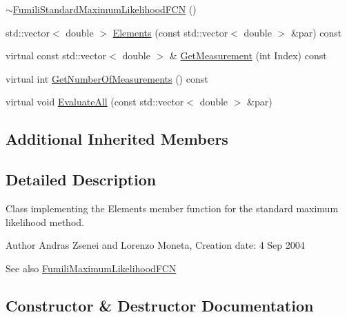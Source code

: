 \begin{DoxyCompactItemize}
\item 
\mbox{\hyperlink{classROOT_1_1Minuit2_1_1FumiliStandardMaximumLikelihoodFCN_aa43a2e65c5083814ee9a08ee51f6abd5}{$\sim$\+Fumili\+Standard\+Maximum\+Likelihood\+F\+CN}} ()
\item 
std\+::vector$<$ double $>$ \mbox{\hyperlink{classROOT_1_1Minuit2_1_1FumiliStandardMaximumLikelihoodFCN_af104474f9095c245b467f9db554a126a}{Elements}} (const std\+::vector$<$ double $>$ \&par) const
\item 
virtual const std\+::vector$<$ double $>$ \& \mbox{\hyperlink{classROOT_1_1Minuit2_1_1FumiliStandardMaximumLikelihoodFCN_a942bb66ec7d48d9ec0ea3d883dff7378}{Get\+Measurement}} (int Index) const
\item 
virtual int \mbox{\hyperlink{classROOT_1_1Minuit2_1_1FumiliStandardMaximumLikelihoodFCN_a7c1f879db750fb33c206d3edbbd19ae0}{Get\+Number\+Of\+Measurements}} () const
\item 
virtual void \mbox{\hyperlink{classROOT_1_1Minuit2_1_1FumiliStandardMaximumLikelihoodFCN_a37e72fc87092e5699066098fa5a31235}{Evaluate\+All}} (const std\+::vector$<$ double $>$ \&par)
\end{DoxyCompactItemize}
\subsection*{Additional Inherited Members}


\subsection{Detailed Description}
Class implementing the Elements member function for the standard maximum likelihood method.

\begin{DoxyAuthor}{Author}
Andras Zsenei and Lorenzo Moneta, Creation date\+: 4 Sep 2004
\end{DoxyAuthor}
\begin{DoxySeeAlso}{See also}
\mbox{\hyperlink{classROOT_1_1Minuit2_1_1FumiliMaximumLikelihoodFCN}{Fumili\+Maximum\+Likelihood\+F\+CN}} 
\end{DoxySeeAlso}


\subsection{Constructor \& Destructor Documentation}
\mbox{\label{classROOT_1_1Minuit2_1_1FumiliStandardMaximumLikelihoodFCN_af7dc80571b509a0a4f2f7ef821c3b1e6}} 

